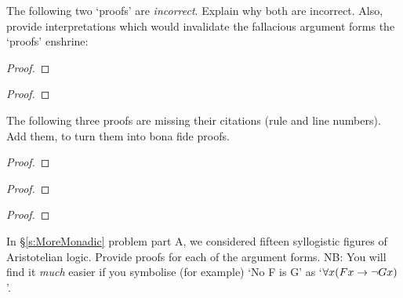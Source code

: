 \practiceproblems
\problempart
The following two `proofs' are \emph{incorrect}. Explain why both are incorrect. Also, provide interpretations which would invalidate the fallacious argument forms the `proofs' enshrine:
\begin{multicols}{2}
	\begin{proof}
	\end{proof}
	\begin{proof}
		\open
		\close
	\end{proof}
\end{multicols}

\problempart 
\label{pr.justifyFOLproof}
The following three proofs are missing their citations (rule and line numbers). Add them, to turn them into bona fide proofs. 
\begin{proof}
	\open
	\close
{} {}
\end{proof}
\begin{multicols}{2}
\begin{proof}
 {}
 {}
\end{proof}
\begin{proof}
\open
\close
{}
\end{proof}
\end{multicols}


\problempart
\label{pr.BarbaraEtc.proof1}
In \S\ref{s:MoreMonadic} problem part A, we considered fifteen syllogistic figures of Aristotelian logic. Provide proofs for each of the argument forms. NB: You will find it \emph{much} easier if you symbolise (for example) `No F is G' as `$\forall x (Fx \rightarrow \neg Gx)$'.

